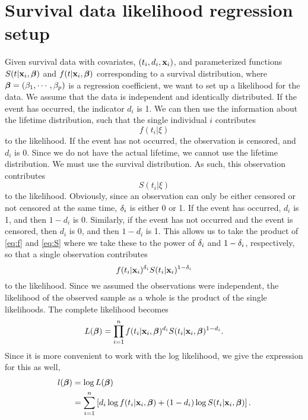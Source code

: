 \section{Survival data likelihood regression setup}
Given survival data with covariates, $(t_i,d_i,\mathbf{x}_i)$, and parameterized functions $S(t|\mathbf{x}_i,\boldsymbol{\beta})$ and $f(t|\mathbf{x}_i,\boldsymbol{\beta})$ corresponding to a survival distribution, where $\boldsymbol{\beta}=(\beta_1,\cdots,\beta_p)$ is a regression coefficient, we want to set up a likelihood for the data. We assume that the data is independent and identically distributed. If the event has occurred, the indicator $d_i$ is 1. We can then use the information about the lifetime distribution, such that the single individual $i$ contributes
\begin{equation}\label{eq:f}
    f(t_i|\xi)
\end{equation}
to the likelihood. If the event has not occurred, the observation is censored, and $d_i$ is 0. Since we do not have the actual lifetime, we cannot use the lifetime distribution. We must use the survival distribution. As such, this observation contributes
\begin{equation}\label{eq:S}
    S(t_i|\xi)
\end{equation}
to the likelihood. Obviously, since an observation can only be either censored or not censored at the same time, $\delta_{i}$ is either 0 or 1. If the event has occurred, $d_i$ is 1, and then $1-d_i$ is 0. Similarly, if the event has not occurred and the event is censored, then $d_i$
 is 0, and then $1-d_i$ is 1. This allows us to take the product of \eqref{eq:f} and \eqref{eq:S} where we take these to the power of $\delta_{i}$ and $1-\delta_{i}$, respectively, so that a single observation contributes
\begin{equation*}
    f(t_{i}|\mathbf{x}_i)^{\delta_{i}}S(t_{i}|\mathbf{x}_i)^{1-\delta_{i}}
\end{equation*}
to the likelihood. Since we assumed the observations were independent, the likelihood of the observed sample as a whole is the product of the single likelihoods. The complete likelihood becomes
\begin{equation}\label{eq:surv-lik}
    L(\boldsymbol{\beta})=\prod_{i=1}^n f(t_i|\mathbf{x}_i,\boldsymbol{\beta})^{d_i} S(t_i|\mathbf{x}_i,\boldsymbol{\beta})^{1-d_i}.
\end{equation}
Since it is more convenient to work with the log likelihood, we give the expression for this as well,
\begin{align}\label{eq:surv-lik}
\begin{split}
    l(\boldsymbol{\beta})&=\log L(\boldsymbol{\beta}) \\
    &=\sum_{i=1}^n\left[ d_i \log f(t_i|\mathbf{x}_i,\boldsymbol{\beta}) + (1-d_i)\log S(t_i|\mathbf{x}_i,\boldsymbol{\beta})\right].
\end{split}
\end{align}

